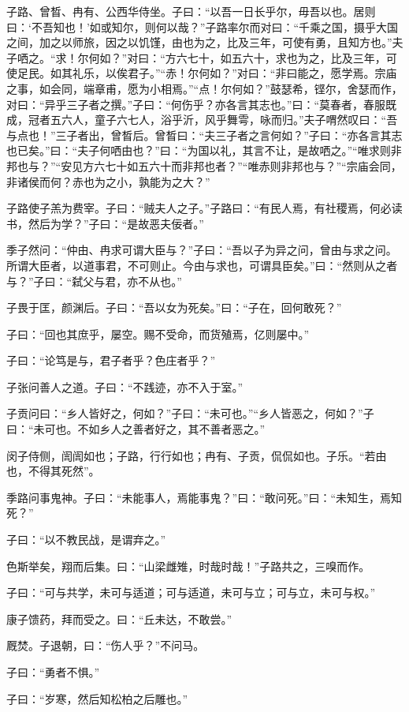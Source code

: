 \documentclass[a5paper]{ctexbook}
\begin{document}
    子路、曾晳、冉有、公西华侍坐。子曰：“以吾一日长乎尔，毋吾以也。居则曰：‘不吾知也！’如或知尔，则何以哉？”子路率尔而对曰：“千乘之国，摄乎大国之间，加之以师旅，因之以饥馑，由也为之，比及三年，可使有勇，且知方也。”夫子哂之。“求！尔何如？”对曰：“方六七十，如五六十，求也为之，比及三年，可使足民。如其礼乐，以俟君子。”“赤！尔何如？”对曰：“非曰能之，愿学焉。宗庙之事，如会同，端章甫，愿为小相焉。”“点！尔何如？”鼓瑟希，铿尔，舍瑟而作，对曰：“异乎三子者之撰。”子曰：“何伤乎？亦各言其志也。”曰：“莫春者，春服既成，冠者五六人，童子六七人，浴乎沂，风乎舞雩，咏而归。”夫子喟然叹曰：“吾与点也！”三子者出，曾晳后。曾晳曰：“夫三子者之言何如？”子曰：“亦各言其志也已矣。”曰：“夫子何哂由也？”曰：“为国以礼，其言不让，是故哂之。”“唯求则非邦也与？”“安见方六七十如五六十而非邦也者？”“唯赤则非邦也与？”“宗庙会同，非诸侯而何？赤也为之小，孰能为之大？”

    子路使子羔为费宰。子曰：“贼夫人之子。”子路曰：“有民人焉，有社稷焉，何必读书，然后为学？”子曰：“是故恶夫佞者。”

    季子然问：“仲由、冉求可谓大臣与？”子曰：“吾以子为异之问，曾由与求之问。所谓大臣者，以道事君，不可则止。今由与求也，可谓具臣矣。”曰：“然则从之者与？”子曰：“弑父与君，亦不从也。”

    子畏于匡，颜渊后。子曰：“吾以女为死矣。”曰：“子在，回何敢死？”

    子曰：“回也其庶乎，屡空。赐不受命，而货殖焉，亿则屡中。”

    子曰：“论笃是与，君子者乎？色庄者乎？”

    子张问善人之道。子曰：“不践迹，亦不入于室。”

    子贡问曰：“乡人皆好之，何如？”子曰：“未可也。”“乡人皆恶之，何如？”子曰：“未可也。不如乡人之善者好之，其不善者恶之。”

    闵子侍侧，訚訚如也；子路，行行如也；冉有、子贡，侃侃如也。子乐。“若由也，不得其死然”。

    季路问事鬼神。子曰：“未能事人，焉能事鬼？”曰：“敢问死。”曰：“未知生，焉知死？”

    子曰：“以不教民战，是谓弃之。”

    色斯举矣，翔而后集。曰：“山梁雌雉，时哉时哉！”子路共之，三嗅而作。

    子曰：“可与共学，未可与适道；可与适道，未可与立；可与立，未可与权。”

    康子馈药，拜而受之。曰：“丘未达，不敢尝。”
    
    厩焚。子退朝，曰：“伤人乎？”不问马。

    子曰：“勇者不惧。”

    子曰：“岁寒，然后知松柏之后雕也。”
\end{document}
